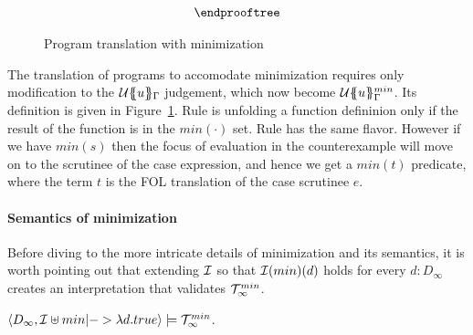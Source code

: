 \begin{figure}
\[\begin{array}{c}
{\begin{array}{l}
  \end{array}}
\endprooftree
\end{array}\]
\caption{Program translation with minimization}\label{fig:min-def-trans-min}
\end{figure}

The translation of programs to accomodate minimization requires only modification 
to the ${\cal U}\{\!\!\{u\}\!\!\}_{\Gamma}$ judgement, which now become ${\cal U}\{\!\!\{u\}\!\!\}_{\Gamma}^{min}$. Its definition
is given in Figure~\ref{fig:min-def-trans-min}. Rule  is unfolding a function
defininion only if the result of the function is in the $min(\cdot)$ set. Rule 
has the same flavor. However if we have $min(s)$ then the focus of evaluation in the counterexample
will move on to the scrutinee of the case expression, and hence we get a $min(t)$ predicate, where the 
term $t$ is the FOL translation of the case scrutinee $e$.

\paragraph{Semantics of minimization}
\newcommand{\ThMin}{\Th_{\infty}^{min}}
\newcommand{\SDownarrow}{\downarrow}

Before diving to the more intricate details of minimization and its semantics, it is worth pointing out that 
extending ${\cal I}$ so that ${\cal I}(min)(d)$ holds for every $d : D_\infty$ creates an interpretation that 
validates $\ThMin$. 
\begin{theorem} $\langle D_\infty, {\cal I}\uplus min |-> \lambda d.true\rangle \models \ThMin$. \end{theorem} 


